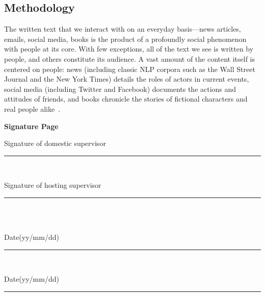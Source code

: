 \documentclass[11pt]{article}
\renewcommand\cite{\citep}  %
\begin{document}
\subsection{Methodology}
The written text that we interact with on an everyday basis—news articles, emails, social media, books is the product of a profoundly social phenomenon with people at its core. With few exceptions, all of the text we see is written by people, and others constitute its audience. A vast amount of the content itself is centered on people: news (including classic NLP corpora such as the Wall Street Journal and the New York Times) details the roles of actors in current events, social media (including Twitter and Facebook) documents
the actions and attitudes of friends, and books chronicle the stories of fictional characters and real people alike~\cite{serban2016building}.



\newpage
\begin{center}{\Large\bf Signature Page}\end{center}
\vspace{0.5cm}

\newcommand{\namesigdate}[2][5cm]{
\begin{minipage}{#1}
    #2 \vspace{1cm}\hrule\smallskip
\end{minipage}
}

\noindent \namesigdate[6cm]{Signature of domestic supervisor} \ \hfill \namesigdate[6cm]{Signature of hosting supervisor} 
\\
\vspace{.3cm}\smallskip \\ 
\noindent \namesigdate[6cm]{Date(yy/mm/dd)} \ \hfill \namesigdate[6cm]{Date(yy/mm/dd)}
\\
\end{document}
